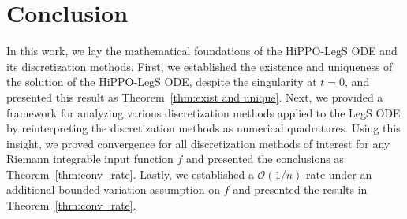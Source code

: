 \documentclass{article}
\theoremstyle{definition}
\begin{document}





\section{Conclusion} \label{sec:conclusion}
In this work, we lay the mathematical foundations of the HiPPO-LegS ODE and its discretization methods. First, we established the existence and uniqueness of the solution of the HiPPO-LegS ODE, despite the singularity at $t=0$, and presented this result as Theorem~\ref{thm:exist and unique}. Next, we provided a framework for analyzing various discretization methods applied to the LegS ODE by reinterpreting the discretization methods as numerical quadratures. Using this insight, we proved convergence for all discretization methods of interest for any Riemann integrable input function $f$ and presented the conclusions as Theorem~\ref{thm:conv_rate}. Lastly, we established a $\mathcal{O}(1/n)$-rate under an additional bounded variation assumption on $f$ and presented the results in Theorem~\ref{thm:conv_rate}.






\end{document}
